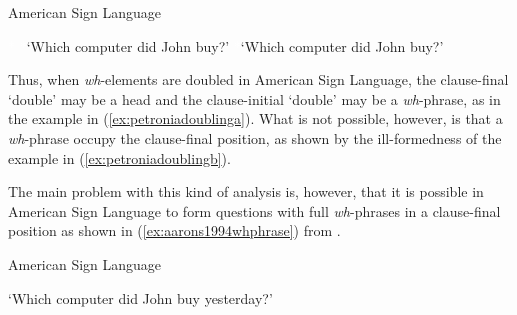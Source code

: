 \begin{exe}
\ex American Sign Language \citep[33]{petronio1997}\label{petroniadoubling}\begin{xlist} 
\ex \textcolor{white}{*}
\glt \textcolor{white}{*}`Which computer did John buy?' \label{ex:petroniadoublinga}
\ex * 
\glt \textcolor{white}{*}`Which computer did John buy?' \label{ex:petroniadoublingb} 
\end{xlist}
\end{exe}

\noindent Thus, when \textit{wh}-elements are doubled in American Sign Language, the clause-final `double' may be a head and the clause-initial `double' may be a \textit{wh}-phrase, as in the example in (\ref{ex:petroniadoublinga}). What is not possible, however, is that a \textit{wh}-phrase occupy the clause-final position, as shown by the ill-formedness of the example in (\ref{ex:petroniadoublingb}).

The main problem with this kind of analysis is, however, that it is possible in American Sign Language to form questions with full \textit{wh}-phrases in a clause-final position as shown in (\ref{ex:aarons1994whphrase}) from \citet[92]{aarons1994aspects}.

\begin{exe}
\ex American Sign Language \citep[92]{aarons1994aspects} \\  

\glt `Which computer did John buy yesterday?' \label{ex:aarons1994whphrase} 
\end{exe}

